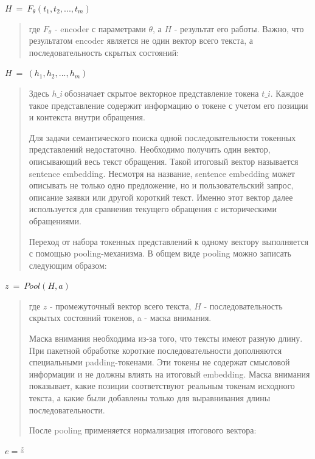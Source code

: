 \documentclass[
]{article}
\begin{document}
\(H\  = \ F_{\theta}(t_{1},t_{2},...,t_{m})\)

\begin{quote}
где \(F_{\theta}\) - encoder с параметрами \(\theta\), а \(H\) -
результат его работы. Важно, что результатом encoder является не один
вектор всего текста, а последовательность скрытых состояний:
\end{quote}

\(H\  = \ (h_{1},h_{2},...,h_{m})\)

\begin{quote}
Здесь \(h\_ i\ \)обозначает скрытое векторное представление токена
\(t\_ i\). Каждое такое представление содержит информацию о токене с
учетом его позиции и контекста внутри обращения.

Для задачи семантического поиска одной последовательности токенных
представлений недостаточно. Необходимо получить один вектор, описывающий
весь текст обращения. Такой итоговый вектор называется sentence
embedding. Несмотря на название, sentence embedding может описывать не
только одно предложение, но и пользовательский запрос, описание заявки
или другой короткий текст. Именно этот вектор далее используется для
сравнения текущего обращения с историческими обращениями.

Переход от набора токенных представлений к одному вектору выполняется с
помощью pooling-механизма. В общем виде pooling можно записать следующим
образом:
\end{quote}

\(z\  = \ Pool(H,a)\)

\begin{quote}
где \(z\) - промежуточный вектор всего текста, \(H\) -
последовательность скрытых состояний токенов, a - маска внимания.

Маска внимания необходима из-за того, что тексты имеют разную длину. При
пакетной обработке короткие последовательности дополняются специальными
padding-токенами. Эти токены не содержат смысловой информации и не
должны влиять на итоговый embedding. Маска внимания показывает, какие
позиции соответствуют реальным токенам исходного текста, а какие были
добавлены только для выравнивания длины последовательности.

После pooling применяется нормализация итогового вектора:
\end{quote}

\(e = \frac{z}{}\)
\end{document}
